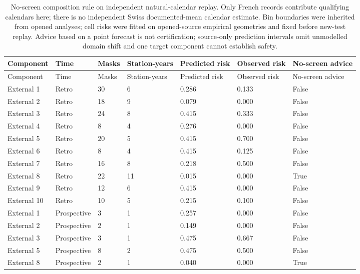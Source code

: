 {\tabletext
\setlength{\tabcolsep}{3pt}
\begin{longtable}{p{}p{}p{}p{}p{}p{}p{}}
\caption{No-screen composition rule on independent natural-calendar replay. Only French records contribute qualifying calendars here; there is no independent Swiss documented-mean calendar estimate. Bin boundaries were inherited from opened analyses; cell risks were fitted on opened-source empirical geometries and fixed before new-test replay. Advice based on a point forecast is not certification; source-only prediction intervals omit unmodelled domain shift and one target component cannot establish safety.}\label{tab:r3si-composition}\\
\toprule
Component & Time & Masks & Station-years & Predicted risk & Observed risk & No-screen advice \\
\midrule
\endfirsthead
\toprule
Component & Time & Masks & Station-years & Predicted risk & Observed risk & No-screen advice \\
\midrule
\endhead
External 1 & Retro & 30 & 6 & 0.286 & 0.133 & False \\
External 2 & Retro & 18 & 9 & 0.079 & 0.000 & False \\
External 3 & Retro & 24 & 8 & 0.415 & 0.333 & False \\
External 4 & Retro & 8 & 4 & 0.276 & 0.000 & False \\
External 5 & Retro & 20 & 5 & 0.415 & 0.700 & False \\
External 6 & Retro & 8 & 4 & 0.415 & 0.125 & False \\
External 7 & Retro & 16 & 8 & 0.218 & 0.500 & False \\
External 8 & Retro & 22 & 11 & 0.015 & 0.000 & True \\
External 9 & Retro & 12 & 6 & 0.415 & 0.000 & False \\
External 10 & Retro & 10 & 5 & 0.215 & 0.100 & False \\
External 1 & Prospective & 3 & 1 & 0.257 & 0.000 & False \\
External 2 & Prospective & 2 & 1 & 0.149 & 0.000 & False \\
External 3 & Prospective & 3 & 1 & 0.475 & 0.667 & False \\
External 5 & Prospective & 8 & 2 & 0.475 & 0.500 & False \\
External 8 & Prospective & 2 & 1 & 0.040 & 0.000 & True \\
\bottomrule
\end{longtable}
}

